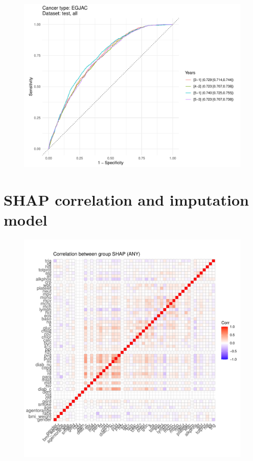\documentclass[english]{article}
\begin{document}
\begin{figure}[ht]
\includegraphics[width=1.0\linewidth]{years/2y_EGJAC_all.pdf}
\end{figure}



\newpage
\clearpage
\section{SHAP correlation and imputation model}



\begin{figure}[ht]
\includegraphics[width=1.0\linewidth]{variable_importance/shap_corr_groups_ANY.pdf}
\end{figure}
\end{document}
